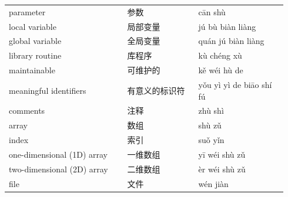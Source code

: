 \documentclass[11pt]{article}
\begin{document}
\begin{longtable}{@{}p{0.40\linewidth}p{0.24\linewidth}p{0.30\linewidth}@{}}
parameter & 参数 & cān shù \\
local variable & 局部变量 & jú bù biàn liàng \\
global variable & 全局变量 & quán jú biàn liàng \\
library routine & 库程序 & kù chéng xù \\
maintainable & 可维护的 & kě wéi hù de \\
meaningful identifiers & 有意义的标识符 & yǒu yì yì de biāo shí fú \\
comments & 注释 & zhù shì \\
array & 数组 & shù zǔ \\
index & 索引 & suǒ yǐn \\
one-dimensional (1D) array & 一维数组 & yī wéi shù zǔ \\
two-dimensional (2D) array & 二维数组 & èr wéi shù zǔ \\
file & 文件 & wén jiàn \\
\end{longtable}
\end{document}
